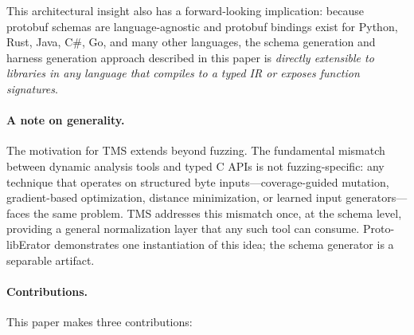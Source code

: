 \documentclass[sigconf,anonymous]{acmart}
\begin{document}
\noindent This architectural insight also has a forward-looking
implication: because protobuf schemas are language-agnostic and
protobuf bindings exist for Python, Rust, Java, C\#, Go, and many other
languages, the schema generation and harness generation approach
described in this paper is \emph{directly extensible to libraries in
any language that compiles to a typed IR or exposes function signatures}.

\paragraph{A note on generality.}
\noindent The motivation for TMS extends beyond fuzzing.  The fundamental
mismatch between dynamic analysis tools and typed C APIs is not
fuzzing-specific: any technique that operates on structured byte
inputs---coverage-guided mutation, gradient-based optimization,
distance minimization, or learned input generators---faces the same
problem.  TMS addresses this mismatch once, at the schema level,
providing a general normalization layer that any such tool can consume.
Proto-libErator demonstrates one instantiation of this idea; the schema
generator is a separable artifact.

\paragraph{Contributions.}

\noindent This paper makes three contributions:
\end{document}
